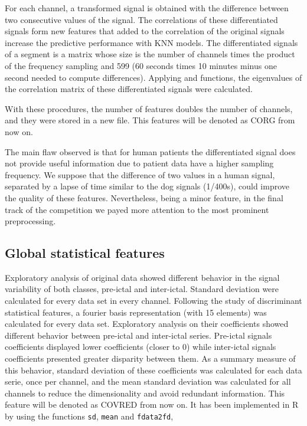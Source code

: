 \documentclass[a4paper,english,twoside]{article}
\begin{document}
For each channel, a transformed signal is obtained with the difference between
two consecutive values of the signal.  The correlations of these differentiated
signals form new features that added to the correlation of the original signals
increase the predictive performance with KNN models. The differentiated signals
of a segment is a matrix whose size is the number of channels times the product
of the frequency sampling and 599 (60 seconds times 10 minutes minus one second
needed to compute differences). Applying \verb@eigen@ and \verb@cor@ functions,
the eigenvalues of the correlation matrix of these differentiated signals were
calculated.

With these procedures, the number of features doubles the number of
channels, and they were stored in a new file. This features will be denoted as CORG
from now on.

The main flaw observed is that for human patients the differentiated signal does
not provide useful information due to patient data have a higher sampling
frequency. We suppose that the difference of two values in a human signal,
separated by a lapse of time similar to the dog signals (1/400s), could improve
the quality of these features.  Nevertheless, being a minor feature, in the
final track of the competition we payed more attention to the most prominent
preprocessing.

\subsection{Global statistical
  features}\label{global-statistical-features}

Exploratory analysis of original data showed different behavior in the signal
variability of both classes, pre-ictal and inter-ictal. Standard deviation were
calculated for every data set in every channel.  Following the study of
discriminant statistical features, a fourier basis representation (with 15
elements) was calculated for every data set. Exploratory analysis on their
coefficients showed different behavior between pre-ictal and inter-ictal
series. Pre-ictal signals coefficients displayed lower coefficients (closer to
0) while inter-ictal signals coefficients presented greater disparity between
them. As a summary measure of this behavior, standard deviation of these
coefficients was calculated for each data serie, once per channel, and the mean
standard deviation was calculated for all channels to reduce the dimensionality
and avoid redundant information. This feature will be denoted as COVRED from now
on. It has been implemented in R by using the functions \verb+sd+, \verb+mean+
and \verb+fdata2fd+,
\end{document}
